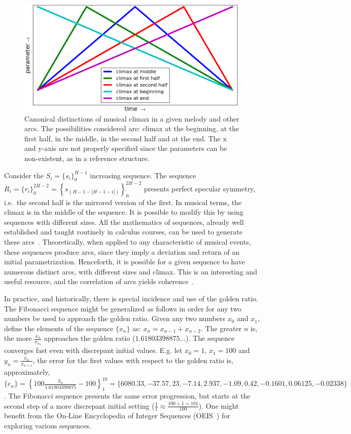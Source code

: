 \begin{figure}
    \centering
        \includegraphics[width=.8\columnwidth]{figures/climax_}
        \caption{Canonical distinctions of musical climax in a given melody and
        other arcs. The possibilities considered are: climax at the beginning, at the first half, in the middle, in the second half and 
        at the end. The x and y-axis are not properly specified since the parameters can be non-existent, as in a reference structure.}
        \label{fig:climax}
\end{figure}

Consider the $S_i=\{s_i\}_0^{H-1}$ increasing sequence. The sequence
$R_i=\{r_i\}_0^{2H -2}=\left\{s_{(H-1-|H-1-i|)}\right\}_0^{2H-2}$
presents perfect specular symmetry, i.e.\ the second half is the
mirrored version of the first. In musical terms, the climax is
in the middle of the sequence. It is possible to modify this
by using sequences with different sizes. All the mathematics of
sequences, already well established and taught routinely in calculus courses, can be used to generate these arcs~\cite{Guidorizzo,Schoenberg}.
Theoretically, when applied to any characteristic of musical events,
these sequences produce arcs, since they imply a deviation and return of an initial parametrization.
Henceforth, it is possible for a given sequence to have
numerous distinct arcs, with different sizes and climax. 
This is an interesting and useful resource, and the correlation of arcs yields coherence~\cite{Salzer}.

In practice, and historically, there is special incidence and use of the golden ratio.
The Fibonacci sequence might be generalized as follows in order for any two numbers be used
to approach the golden ratio.
Given any two numbers $x_0$
and $x_1$, define the elements of the sequence $\{x_n\}$ as: $x_n=x_{n-1}+x_{n-2}$.
The greater $n$ is, the more $\frac{x_{n}}{x_{n_1}}$ approaches the golden ratio
($1.61803398875...$). The sequence converges fast even with discrepant
initial values.
E.g. let $x_0=1$, $x_1=100$ and $y_n=\frac{x_n}{x_{n+1}}$, the error for the first values with
respect to the golden ratio is, approximately, $\{ e_n \}
=\left\{100\frac{y_n}{1.61803398875}-100 \right\}_1^{10}=\{6080.33, -37.57, 23,
-7.14, 2.937, -1.09, 0.42, -0.1601, 0.06125, -0.02338\}$. The Fibonacci sequence
presents the same error progression, but starts at the second step of a more discrepant initial setting
($\frac{1}{1}\approx\frac{100+1 = 101}{100}$).
One might benefit from the On-Line Encyclopedia of Integer Sequences (OEIS~\cite{oeis})
for exploring various sequences.

